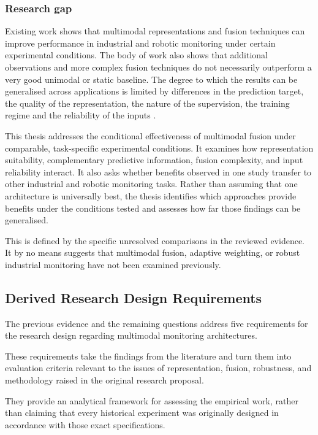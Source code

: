 \subsubsection*{Research gap}

Existing work shows that multimodal representations and fusion techniques can improve performance in
industrial and robotic monitoring under certain experimental conditions. The body of work also shows
that additional observations and more complex fusion techniques do not necessarily outperform a very
good unimodal or static baseline. The degree to which the results can be generalised across
applications is limited by differences in the prediction target, the quality of the representation,
the nature of the supervision, the training regime and the reliability of the inputs
\citep{Wang2020What,Hua2026Weld,Goodarzi2023Deep,Thoduka2024Handover,Zhang2023QMF}.

This thesis addresses the conditional effectiveness of multimodal fusion under comparable,
task-specific experimental conditions. It examines how representation suitability, complementary
predictive information, fusion complexity, and input reliability interact. It also asks whether
benefits observed in one study transfer to other industrial and robotic monitoring tasks. Rather
than assuming that one architecture is universally best, the thesis identifies which approaches
provide benefits under the conditions tested and assesses how far those findings can be generalised.

This is defined by the specific unresolved comparisons in the reviewed evidence. It by no means
suggests that multimodal fusion, adaptive weighting, or robust industrial monitoring have not been
examined previously.

\subsection{Derived Research Design Requirements}

The previous evidence and the remaining questions address five requirements for the research design
regarding multimodal monitoring architectures.

These requirements take the findings from the literature and turn them into evaluation criteria
relevant to the issues of representation, fusion, robustness, and methodology raised in the original
research proposal.

They provide an analytical framework for assessing the empirical work, rather than claiming that
every historical experiment was originally designed in accordance with those exact specifications.


